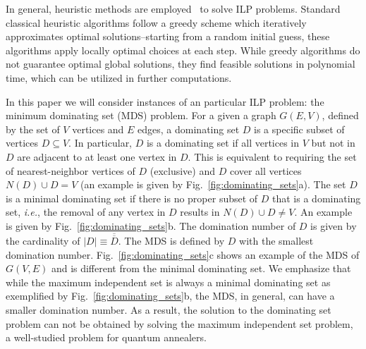\documentclass[10pt]{iopart}
\begin{document}
In general, heuristic methods are employed~\cite{GLOVER1986533, doi:10.1287/ijoc.1.3.190, doi:10.1287/ijoc.2.1.4} to solve ILP problems.
Standard classical heuristic algorithms follow a greedy scheme which iteratively approximates optimal solutions--starting from a random initial guess, these algorithms apply locally optimal choices at each step.
While greedy algorithms do not guarantee optimal global solutions, they find feasible solutions in polynomial time, which can be utilized in further computations.

In this paper we will consider instances of an particular ILP problem: the minimum dominating set (MDS) problem.  For a given a graph $G(E,V)$, defined by the set of $V$ vertices and $E$ edges, a dominating set $D$ is a specific subset of vertices $D \subseteq V$.
In particular, $D$ is a dominating set if all vertices in $V$ but not in $D$ are adjacent to at least one vertex in $D$.
This is equivalent to requiring the set of nearest-neighbor vertices of $D$ (exclusive) and $D$ cover all vertices $N(D) \cup D = V$ (an example is given by Fig.~\ref{fig:dominating_sets}a).
The set $D$ is a minimal dominating set if there is no proper subset of $D$ that is a dominating set, {\it{i.e.}}, the removal of any vertex in $D$ results in $N(D) \cup D  \neq V$.
An example is given by Fig.~\ref{fig:dominating_sets}b.
The domination number of $D$ is given by the cardinality of $|D| \equiv \overline{\overline{D}}$.
The MDS is defined by $D$ with the smallest domination number.
Fig.~\ref{fig:dominating_sets}c shows an example of the MDS of $G(V, E)$ and is different from the minimal dominating set.
We emphasize that while the maximum independent set is always a minimal dominating set as exemplified by Fig.~\ref{fig:dominating_sets}b, the MDS, in general, can have a smaller domination number.
As a result, the solution to the dominating set problem can not be obtained by solving the maximum independent set problem, a well-studied problem for quantum annealers.
\end{document}
